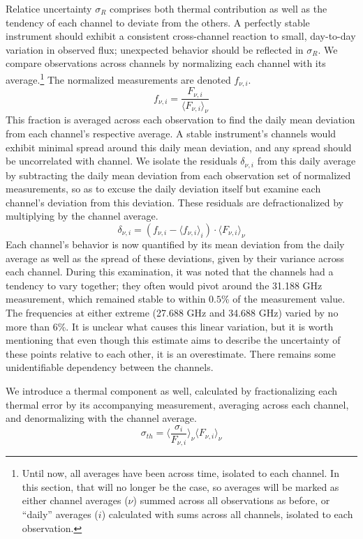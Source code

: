 \documentclass{article}
\begin{document}
	Relatice uncertainty $\sigma_{R}$ comprises both thermal contribution as well as the tendency of each channel to deviate from the others.
	A perfectly stable instrument should exhibit a consistent cross-channel reaction to small, day-to-day variation in observed flux; unexpected behavior should be reflected in $\sigma_{R}$.
	We compare observations across channels by normalizing each channel with its average.\footnote{Until now, all averages have been across time, isolated to each channel.
	In this section, that will no longer be the case, so averages will be marked as either channel averages ($\nu$) summed across all observations as before, or ``daily'' averages ($i$) calculated with sums across all channels, isolated to each observation.}
	The normalized measurements are denoted $f_{\nu, i}$.
	$$ f_{\nu, i} = \frac{F_{\nu, i}}{\langle F_{\nu, i} \rangle_{\nu}} $$
	This fraction is averaged across each observation to find the daily mean deviation from each channel's respective average.
	A stable instrument's channels would exhibit minimal spread around this daily mean deviation, and any spread should be uncorrelated with channel.
	We isolate the residuals $\delta_{\nu, i}$ from this daily average by subtracting the daily mean deviation from each observation set of normalized measurements, so as to excuse the daily deviation itself but examine each channel's deviation from this deviation.
	These residuals are defractionalized by multiplying by the channel average.
	$$ \delta_{\nu, i} = (f_{\nu, i} - \langle f_{\nu, i} \rangle_{i}) \cdot \langle F_{\nu, i} \rangle_{\nu} $$
	Each channel's behavior is now quantified by its mean deviation from the daily average as well as the spread of these deviations, given by their variance across each channel.
	During this examination, it was noted that the channels had a tendency to vary together; they often would pivot around the 31.188 GHz measurement, which remained stable to within $0.5$\% of the measurement value.
	The frequencies at either extreme (27.688 GHz and 34.688 GHz) varied by no more than 6\%.
	It is unclear what causes this linear variation, but it is worth mentioning that even though this estimate aims to describe the uncertainty of these points relative to each other, it is an overestimate.
	There remains some unidentifiable dependency between the channels.

	We introduce a thermal component as well, calculated by fractionalizing each thermal error by its accompanying measurement, averaging across each channel, and denormalizing with the channel average.
	$$\sigma_{th} = \Bigg\langle \frac{\sigma_{i}}{F_{\nu,i}} \Bigg\rangle_{\nu} \langle F_{\nu, i} \rangle_{\nu} $$
\end{document}
